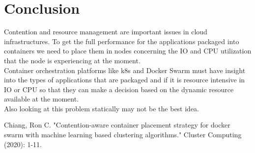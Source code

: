 \documentclass[a4paper, 11pt]{article}
\theoremstyle{nonumberplain}
\begin{document}
\section{Conclusion}
Contention and resource management are important issues in cloud
infrastructures. To get the full performance for the applications packaged
into containers we need to place them in nodes concerning the IO and CPU
utilization that the node is experiencing at the moment. \\
Container orchestration platforms like k8s and Docker Swarm must have insight
into the types of applications that are packaged and if it is resource
intensive in IO or CPU so that they can make a decision based on the dynamic
resource available at the moment. \\
Also looking at this problem statically may not be the best idea.



% 

\begin{thebibliography}{1}
     Chiang, Ron C.
        "Contention-aware container placement strategy for docker swarm with
        machine learning based clustering algorithms."
        Cluster Computing (2020): 1-11.
\end{thebibliography}
\end{document}
